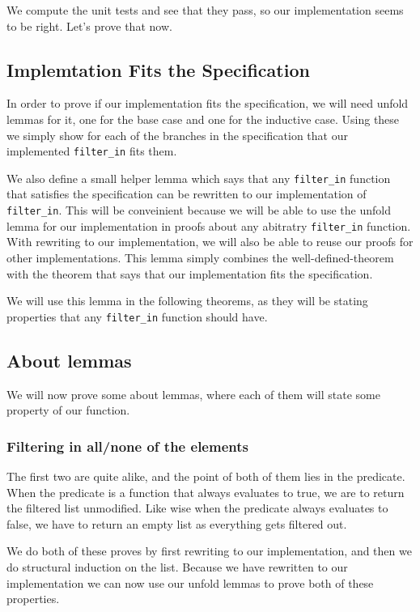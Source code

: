 \documentclass{article}
\begin{document}
We compute the unit tests and see that they pass, so our implementation seems to be right. Let's prove that now.

\subsection{Implemtation Fits the Specification}
In order to prove if our implementation fits the specification, we will need unfold lemmas for it, one for the base case and one for the inductive case. Using these we simply show for each of the branches in the specification that our implemented \texttt{filter\_in} fits them.

We also define a small helper lemma which says that any \texttt{filter\_in} function that satisfies the specification can be rewritten to our implementation of \texttt{filter\_in}. This will be conveinient because we will be able to use the unfold lemma for our implementation in proofs about any abitratry \texttt{filter\_in} function. With rewriting to our implementation, we will also be able to reuse our proofs for other implementations. This lemma simply combines the well-defined-theorem with the theorem that says that our implementation fits the specification.

We will use this lemma in the following theorems, as they will be stating properties that any \texttt{filter\_in} function should have.

\subsection{About lemmas}
We will now prove some about lemmas, where each of them will state some property of our function. 

\subsubsection{Filtering in all/none of the elements}
The first two are quite alike, and the point of both of them lies in the predicate. When the predicate is a function that always evaluates to true, we are to return the filtered list unmodified. Like wise when the predicate always evaluates to false, we have to return an empty list as everything gets filtered out.

We do both of these proves by first rewriting to our implementation, and then we do structural induction on the list. Because we have rewritten to our implementation we can now use our unfold lemmas to prove both of these properties.
\end{document}
